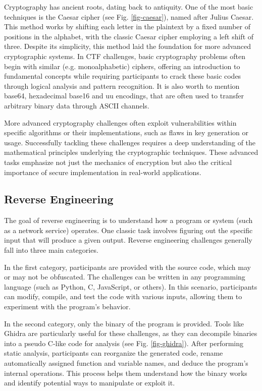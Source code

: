 \documentclass[conference]{IEEEtran}
\begin{document}
Cryptography has ancient roots, dating back to antiquity. One of the most basic
techniques is the Caesar cipher (see Fig. \ref{fig-caesar}),
named after Julius Caesar. This method works
by shifting each letter in the plaintext by a fixed number of positions in the
alphabet, with the classic Caesar cipher employing a left shift of three.
Despite its simplicity, this method laid the foundation for more advanced
cryptographic systems. In CTF challenges, basic cryptography problems often
begin with similar (e.g. monoalphabetic) ciphers, offering an introduction
to fundamental concepts
while requiring participants to crack these basic codes through logical
analysis and pattern recognition.
It is also worth to mention base64, hexadecimal base16 and uu encodings,
that are often used to transfer arbitrary binary data through ASCII channels.

More advanced cryptography challenges often exploit vulnerabilities within
specific algorithms or their implementations, such as flaws in key generation
or usage. Successfully tackling these challenges requires a deep understanding
of the mathematical principles underlying the cryptographic techniques.
These
advanced tasks emphasize not just the mechanics of encryption but also the
critical importance of secure implementation in real-world applications.

\subsection{Reverse Engineering}

The goal of reverse engineering is to understand how a program or system (such
as a network service) operates. One classic task involves figuring out the
specific input that will produce a given output. Reverse engineering challenges
generally fall into three main categories.

In the first category, participants are provided with the source code, which
may or may not be obfuscated. The challenges can be written in any programming
language (such as Python, C, JavaScript, or others). In this scenario,
participants can modify, compile, and test the code with various inputs,
allowing them to experiment with the program’s behavior.

In the second category, only the binary of the program is provided. Tools like
Ghidra
\cite{eagle2020}
are particularly useful for these challenges, as they can decompile
binaries into a pseudo C-like code for analysis (see Fig. \ref{fig-ghidra}).
After performing static
analysis, participants can reorganize the generated code, rename automatically
assigned function and variable names, and deduce the program's internal
operations. This process helps them understand how the binary works and
identify potential ways to manipulate or exploit it.
\end{document}
